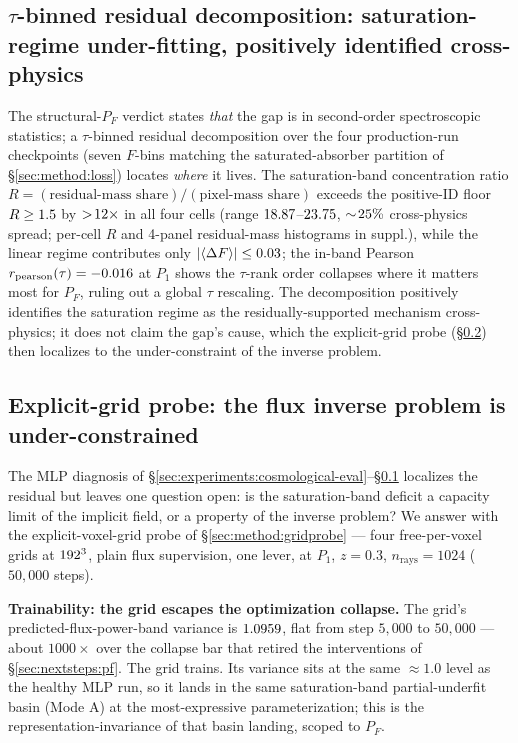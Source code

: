 \subsection{\texorpdfstring{$\tau$-binned residual decomposition: saturation-regime under-fitting, positively identified cross-physics}{tau-binned residual decomposition: saturation-regime under-fitting, positively identified cross-physics}}
\label{sec:experiments:tau-binned}
The structural-$P_F$ verdict states \emph{that} the gap is in second-order spectroscopic statistics; a $\tau$-binned residual decomposition over the four production-run checkpoints (seven $F$-bins matching the saturated-absorber partition of \S\ref{sec:method:loss}) locates \emph{where} it lives. The saturation-band concentration ratio $R = (\text{residual-mass share})/(\text{pixel-mass share})$ exceeds the positive-ID floor $R \geq 1.5$ by $>\!12\times$ in all four cells (range $18.87$--$23.75$, $\sim\!25\%$ cross-physics spread; per-cell $R$ and 4-panel residual-mass histograms in suppl.), while the linear regime contributes only $|\langle\Delta F\rangle| \leq 0.03$; the in-band Pearson $r_{\text{pearson}}(\tau) = -0.016$ at $P_1$ shows the $\tau$-rank order collapses where it matters most for $P_F$, ruling out a global $\tau$ rescaling. The decomposition positively identifies the saturation regime as the residually-supported mechanism cross-physics; it does not claim the gap's cause, which the explicit-grid probe (\S\ref{sec:experiments:gridprobe}) then localizes to the under-constraint of the inverse problem.

\subsection{Explicit-grid probe: the flux inverse problem is under-constrained}
\label{sec:experiments:gridprobe}
The MLP diagnosis of \S\ref{sec:experiments:cosmological-eval}--\S\ref{sec:experiments:tau-binned} localizes the residual but leaves one question open: is the saturation-band deficit a capacity limit of the implicit field, or a property of the inverse problem? We answer with the explicit-voxel-grid probe of \S\ref{sec:method:gridprobe} --- four free-per-voxel grids at $192^3$, plain flux supervision, one lever, at $P_1$, $z = 0.3$, $n_{\text{rays}} = 1024$ ($50{,}000$ steps).

\textbf{Trainability: the grid escapes the optimization collapse.} The grid's predicted-flux-power-band variance is $1.0959$, flat from step $5{,}000$ to $50{,}000$ --- about $1000\times$ over the collapse bar that retired the interventions of \S\ref{sec:nextsteps:pf}. The grid trains. Its variance sits at the same $\approx\!1.0$ level as the healthy MLP run, so it lands in the same saturation-band partial-underfit basin (Mode A) at the most-expressive parameterization; this is the representation-invariance of that basin landing, scoped to $P_F$.

